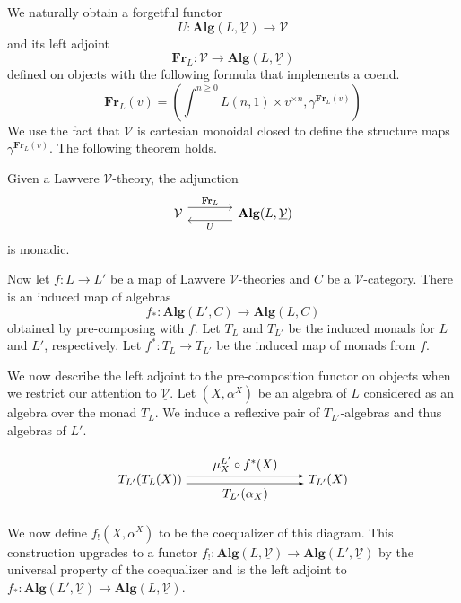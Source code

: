 \documentclass{tac}
\begin{document}
We naturally obtain a forgetful functor 
 \[
 U:\mathbf{Alg}(L,\underline{\mathcal{V}})\to \mathcal{V}
 \]
 and its left adjoint 
 \[
 \mathbf{Fr}_L:\mathcal{V}\to \mathbf{Alg}(L,\underline{\mathcal{V}})
 \]
 defined on objects with the following formula that implements a coend.
 \[
 \mathbf{Fr}_L(v)=\left(\int^{n\geq 0}L(n,1)\times v^{\times n}, \gamma^{\mathbf{Fr}_L(v)}\right)
 \]
 We use the fact that $\mathcal{V}$ is cartesian monoidal closed to define the structure maps $\gamma^{\mathbf{Fr}_L(v)}$. The following theorem holds. 

 \begin{theorem}
Given a Lawvere $\mathcal{V}$-theory, the adjunction
\[
\begin{tikzcd}[column sep=large]
\mathcal{V}
\arrow[r, shift left=1.2ex, "\mathbf{Fr}_L"]
&
\mathbf{Alg}(L,\underline{\mathcal{V}})
\arrow[l, shift left=1.2ex, "U"]
\end{tikzcd}
\]
is monadic. 
 \end{theorem}


Now let $f:L\to L'$ be a map of Lawvere $\mathcal{V}$-theories and $C$ be a $\mathcal{V}$-category. There is an induced map of algebras
\[
f_*:\mathbf{Alg}(L',C)\to \mathbf{Alg}(L,C)
\]
obtained by pre-composing with $f$. Let $T_L$ and $T_{L'}$ be the induced monads for $L$ and $L'$, respectively. Let $f^*:T_L\to T_{L'}$ be the induced map of monads from $f$.

We now describe the left adjoint to the pre-composition functor on objects when we restrict our attention to $\underline{\mathcal{V}}$. Let $(X,\alpha^X)$ be an algebra of $L$ considered as an algebra over the monad $T_L$. We induce a reflexive pair of $T_{L'}$-algebras and thus algebras of $L'$.

\[
\begin{tikzpicture}[>=latex]
\node (A) at (0,0) {$T_{L'}(T_L(X))$};
\node (B) at (5,0) {$T_{L'}(X)$};

\draw[->]
([yshift=3pt]A.east) --
node[above] {$\mu^{L'}_X\circ f^*(X)$}
([yshift=3pt]B.west);

\draw[->]
([yshift=-3pt]A.east) --
node[below] {$T_{L'}(\alpha_X)$}
([yshift=-3pt]B.west);
\end{tikzpicture}
\]

We now define $f_!(X,\alpha^X)$ to be the coequalizer of this diagram. This construction upgrades to a functor $f_!:\mathbf{Alg}(L,\underline{\mathcal{V}})\to \mathbf{Alg}(L',\underline{\mathcal{V}})$ by the universal property of the coequalizer and is the left adjoint to $f_*:\mathbf{Alg}(L',\underline{\mathcal{V}})\to \mathbf{Alg}(L,\underline{\mathcal{V}})$. 
\end{document}
